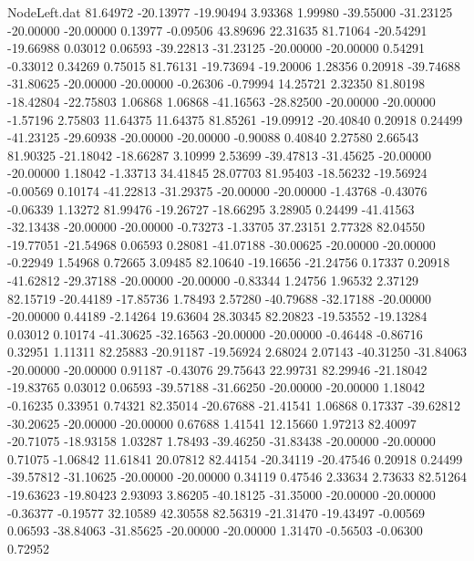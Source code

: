 \begin{filecontents}{NodeLeft.dat}
  81.64972  -20.13977  -19.90494     3.93368    1.99980  -39.55000  -31.23125  -20.00000  -20.00000    0.13977   -0.09506   43.89696   22.31635
  81.71064  -20.54291  -19.66988     0.03012    0.06593  -39.22813  -31.23125  -20.00000  -20.00000    0.54291   -0.33012    0.34269    0.75015
  81.76131  -19.73694  -19.20006     1.28356    0.20918  -39.74688  -31.80625  -20.00000  -20.00000   -0.26306   -0.79994   14.25721    2.32350
  81.80198  -18.42804  -22.75803     1.06868    1.06868  -41.16563  -28.82500  -20.00000  -20.00000   -1.57196    2.75803   11.64375   11.64375
  81.85261  -19.09912  -20.40840     0.20918    0.24499  -41.23125  -29.60938  -20.00000  -20.00000   -0.90088    0.40840    2.27580    2.66543
  81.90325  -21.18042  -18.66287     3.10999    2.53699  -39.47813  -31.45625  -20.00000  -20.00000    1.18042   -1.33713   34.41845   28.07703
  81.95403  -18.56232  -19.56924    -0.00569    0.10174  -41.22813  -31.29375  -20.00000  -20.00000   -1.43768   -0.43076   -0.06339    1.13272
  81.99476  -19.26727  -18.66295     3.28905    0.24499  -41.41563  -32.13438  -20.00000  -20.00000   -0.73273   -1.33705   37.23151    2.77328
  82.04550  -19.77051  -21.54968     0.06593    0.28081  -41.07188  -30.00625  -20.00000  -20.00000   -0.22949    1.54968    0.72665    3.09485
  82.10640  -19.16656  -21.24756     0.17337    0.20918  -41.62812  -29.37188  -20.00000  -20.00000   -0.83344    1.24756    1.96532    2.37129
  82.15719  -20.44189  -17.85736     1.78493    2.57280  -40.79688  -32.17188  -20.00000  -20.00000    0.44189   -2.14264   19.63604   28.30345
  82.20823  -19.53552  -19.13284     0.03012    0.10174  -41.30625  -32.16563  -20.00000  -20.00000   -0.46448   -0.86716    0.32951    1.11311
  82.25883  -20.91187  -19.56924     2.68024    2.07143  -40.31250  -31.84063  -20.00000  -20.00000    0.91187   -0.43076   29.75643   22.99731
  82.29946  -21.18042  -19.83765     0.03012    0.06593  -39.57188  -31.66250  -20.00000  -20.00000    1.18042   -0.16235    0.33951    0.74321
  82.35014  -20.67688  -21.41541     1.06868    0.17337  -39.62812  -30.20625  -20.00000  -20.00000    0.67688    1.41541   12.15660    1.97213
  82.40097  -20.71075  -18.93158     1.03287    1.78493  -39.46250  -31.83438  -20.00000  -20.00000    0.71075   -1.06842   11.61841   20.07812
  82.44154  -20.34119  -20.47546     0.20918    0.24499  -39.57812  -31.10625  -20.00000  -20.00000    0.34119    0.47546    2.33634    2.73633
  82.51264  -19.63623  -19.80423     2.93093    3.86205  -40.18125  -31.35000  -20.00000  -20.00000   -0.36377   -0.19577   32.10589   42.30558
  82.56319  -21.31470  -19.43497    -0.00569    0.06593  -38.84063  -31.85625  -20.00000  -20.00000    1.31470   -0.56503   -0.06300    0.72952

\end{filecontents}
